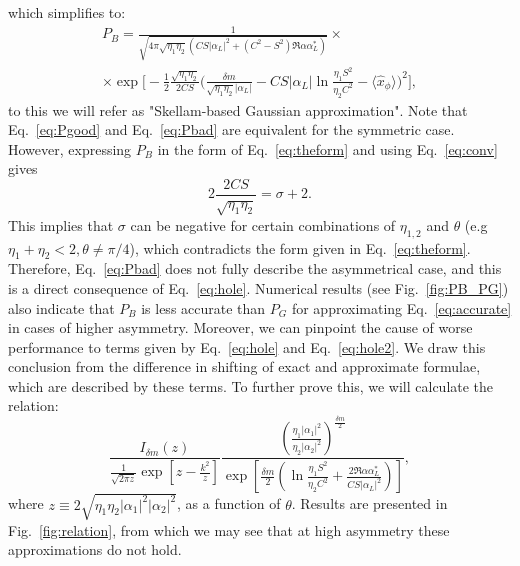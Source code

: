 which simplifies to:
\begin{multline}
    P_B=\frac{1}{\sqrt{4\pi\sqrt{\eta_1\eta_2}\left(CS|\alpha_L|^2+(C^2-S^2)\Re\alpha\alpha_L^*\right)}}
    \times\\\times\exp\biggl[-\frac{1}{2}\frac{\sqrt{\eta_1\eta_2}}{2CS}
    \biggl(\frac{\delta m}{{\sqrt{\eta_1\eta_2}|\alpha_L|}}-
    CS|\alpha_L|\ln\frac{\eta_1S^2}{\eta_2C^2}-\langle\hat{x}_\phi\rangle
    \biggr)^2\biggr],\label{eq:Pbad}
\end{multline}
to this we will refer as "Skellam-based Gaussian approximation".
Note that Eq.~\eqref{eq:Pgood} and Eq.~\eqref{eq:Pbad} are equivalent for the symmetric case. However, expressing $P_B$ in the form of Eq.~\eqref{eq:theform} and using Eq.~\eqref{eq:conv} gives
\begin{equation}
    2\frac{2CS}{\sqrt{\eta_1\eta_2}}=\sigma+2.
\end{equation}
This implies that $\sigma$ can be negative for certain combinations of $\eta_{1,2}$ and $\theta$ (e.g $\eta_1+\eta_2<2, \theta\neq{\pi}/{4}$), which contradicts the form given in Eq.~\eqref{eq:theform}. Therefore, Eq.~\eqref{eq:Pbad} does not fully describe the asymmetrical case, and this is a direct consequence of Eq.~\eqref{eq:hole}. Numerical results (see Fig.~\ref{fig:PB_PG}) also indicate that $P_B$ is less accurate than $P_G$ for approximating Eq.~\eqref{eq:accurate} in cases of higher asymmetry. Moreover, we can pinpoint the cause of worse performance to terms given by Eq.~\eqref{eq:hole} and Eq.~\eqref{eq:hole2}. We draw this conclusion from the difference in shifting of exact and approximate formulae, which are described by these terms. To further prove this, we will calculate the relation:
\begin{equation}
    \frac{I_{\delta m}(z)
    }{\frac{1}{\sqrt{2\pi z}}\exp\left[z-\frac{k^2}{z}\right]}
    \frac{\left(\frac{{\eta_1}|\alpha_1|^2}{{\eta_2}|\alpha_2|^2}\right)^{\frac{\delta m}{2}}}{\exp\left[\frac{\delta m}{2}\left(
    \ln\frac{\eta_1S^2}{\eta_2C^2}+\frac{2\Re\alpha\alpha_L^*}{CS|\alpha_L|^2}\right)
    \right]}
    ,\label{eq:relation}
\end{equation}
where $z\equiv2\sqrt{\eta_1\eta_2|\alpha_1|^2|\alpha_2|^2}$, as a function of $\theta$. Results are presented in Fig.~\ref{fig:relation}, from which we may see that at high asymmetry these approximations do not hold.
